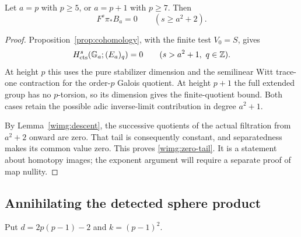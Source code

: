 \begin{proposition}\label{wimg:upper-filtration}
Let $a=p$ with $p\geq5$, or $a=p+1$ with $p\geq7$. Then
\begin{equation}\label{wimg:zero-tail}
 F^s\pi_*B_a=0\qquad(s\geq a^2+2).
\end{equation}
\end{proposition}
\begin{proof}
Proposition~\ref{prop:cohomology}, with the finite test $V_0=S$,
gives
\begin{equation}\label{wimg:coefficient-line}
 H^s_{\operatorname{cts}}(\mathbb G_a;(E_a)_q)=0
 \qquad(s>a^2+1,\ q\in\mathbb Z).
\end{equation}
At height $p$ this uses the pure stabilizer dimension and the
semilinear Witt trace-one contraction for the order-$p$ Galois
quotient. At height $p+1$ the full extended group has no $p$-torsion,
so its dimension gives the finite-quotient bound. Both cases retain
the possible adic inverse-limit contribution in degree $a^2+1$.

By Lemma~\ref{wimg:descent}, the successive quotients of the actual
filtration from $a^2+2$ onward are zero. That tail is consequently
constant, and separatedness makes its common value zero. This proves
\eqref{wimg:zero-tail}. It is a statement about homotopy images;
the exponent argument will require a separate proof of map nullity.
\end{proof}

\subsection{Annihilating the detected sphere product}
\label{wimg:kernel-assembly}

Put $d=2p(p-1)-2$ and $k=(p-1)^2$.

